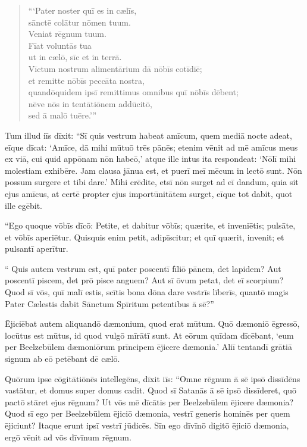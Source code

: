 \begin{verse}
\begin{patverse*}
```Pater noster quī es in cælīs,\\
sānctē colātur nōmen tuum.\\
Veniat rēgnum tuum.\\
Fīat voluntās tua\\
ut in cælō, sīc et in terrā.\\
\Versus Vīctum nostrum alimentārium dā nōbīs cotīdiē;\\
\Versus et remitte nōbīs peccāta nostra,\\
quandōquidem ipsī remittimus omnibus quī nōbīs dēbent;\\
nēve nōs in tentātiōnem addūcitō,\\
sed ā malō tuēre.'{}''
\end{patverse*}
\end{verse}

\Versus Tum illud iīs dīxit: ``Sī quis vestrum habeat amīcum, quem mediā nocte adeat, eīque dīcat: `Amīce, dā mihi mūtuō trēs pānēs;
\Versus etenim vēnit ad mē amīcus meus ex viā, cui quid appōnam nōn habeō,'
\Versus atque ille intus ita respondeat: `Nōlī mihi molestiam exhibēre. Jam clausa jānua est, et puerī meī mēcum in lectō sunt. Nōn possum surgere et tibi dare.'
\Versus Mihi crēdite, etsī nōn surget ad eī dandum, quia sit ejus amīcus, at certē propter ejus importūnitātem surget, eīque tot dabit, quot ille egēbit.

\Versus ``Ego quoque vōbīs dīcō: Petite, et dabitur vōbīs; quærite, et inveniētis; pulsāte, et vōbīs aperiētur.
\Versus Quisquis enim petit, adipīscitur; et quī quærit, invenit; et pulsantī aperītur.

\Versus`` Quis autem vestrum est, quī pater poscentī fīliō pānem, det lapidem? Aut poscentī piscem, det prō pisce anguem?
\Versus Aut sī ōvum petat, det eī scorpium?
\Versus Quod sī vōs, quī malī estis, scītis bona dōna dare vestrīs līberīs, quantō magis Pater Cælestis dabit Sānctum Spīritum petentibus ā sē?''

\Versus Ējiciēbat autem aliquandō dæmonium, quod erat mūtum. Quō dæmoniō ēgressō, locūtus est mūtus, id quod vulgō mīrātī sunt.
\Versus At eōrum quīdam dīcēbant, `eum per Beelzebūlem dæmoniōrum prīncipem ējicere dæmonia.'
\Versus Aliī tentandī grātiā signum ab eō petēbant dē cælō.

\Versus Quōrum ipse cōgitātiōnēs intellegēns, dīxit iīs: ``Omne rēgnum ā sē ipsō dissīdēns vastātur, et domus super domus cadit.
\Versus Quod sī Satanās ā sē ipsō dissīderet, quō pactō stāret ejus rēgnum? Ut vōs mē dīcātis per Beelzebūlem ējicere dæmonia?
\Versus Quod sī ego per Beelzebūlem ējiciō dæmonia, vestrī generis hominēs per quem ējiciunt? Itaque erunt ipsī vestrī jūdicēs.
\Versus Sīn ego dīvīnō digitō ējiciō dæmonia, ergō vēnit ad vōs dīvīnum rēgnum.

